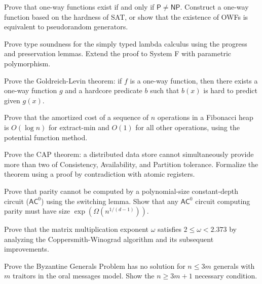 \documentclass[12pt,a4paper]{exam}
\begin{document}
\begin{questions}

\question[4]
Prove that one-way functions exist if and only if $\mathsf{P} \neq \mathsf{NP}$. Construct a one-way function based on the hardness of SAT, or show that the existence of OWFs is equivalent to pseudorandom generators.

\vspace{0.3cm}

\question[2]
Prove type soundness for the simply typed lambda calculus using the progress and preservation lemmas. Extend the proof to System F with parametric polymorphism.

\vspace{0.3cm}

\question[5]
Prove the Goldreich-Levin theorem: if $f$ is a one-way function, then there exists a one-way function $g$ and a hardcore predicate $b$ such that $b(x)$ is hard to predict given $g(x)$.

\vspace{0.3cm}

\question[5]
Prove that the amortized cost of a sequence of $n$ operations in a Fibonacci heap is $O(\log n)$ for extract-min and $O(1)$ for all other operations, using the potential function method.

\vspace{0.3cm}

\question[4]
Prove the CAP theorem: a distributed data store cannot simultaneously provide more than two of Consistency, Availability, and Partition tolerance. Formalize the theorem using a proof by contradiction with atomic registers.

\vspace{0.3cm}

\question[5]
Prove that parity cannot be computed by a polynomial-size constant-depth circuit ($\mathsf{AC}^0$) using the switching lemma. Show that any $\mathsf{AC}^0$ circuit computing parity must have size $\exp(\Omega(n^{1/(d-1)}))$.

\vspace{0.3cm}

\question[5]
Prove that the matrix multiplication exponent $\omega$ satisfies $2 \leq \omega < 2.373$ by analyzing the Coppersmith-Winograd algorithm and its subsequent improvements.

\vspace{0.3cm}

\question[2]
Prove the Byzantine Generals Problem has no solution for $n \leq 3m$ generals with $m$ traitors in the oral messages model. Show the $n \geq 3m+1$ necessary condition.


\end{questions}
\end{document}
